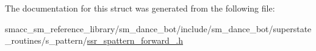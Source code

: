 The documentation for this struct was generated from the following file\+:\begin{DoxyCompactItemize}
\item 
smacc\+\_\+sm\+\_\+reference\+\_\+library/sm\+\_\+dance\+\_\+bot/include/sm\+\_\+dance\+\_\+bot/superstate\+\_\+routines/s\+\_\+pattern/\hyperlink{ssr__spattern__forward__2_8h}{ssr\+\_\+spattern\+\_\+forward\+\_.\+h}\end{DoxyCompactItemize}
